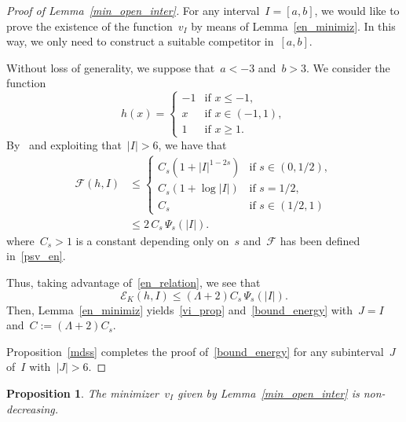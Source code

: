 \documentclass[10pt,a4paper]{amsart}
\newtheorem{prop}[theorem]{Proposition}
\numberwithin{equation}{section}
\newcommand{\Ec}{\mathcal{E}_K}
\begin{document}
\begin{proof}[Proof of Lemma~\ref{min_open_inter}]
For any interval~$I=[a,b]$, we would like to prove the existence of the function~$v_{I}$ by means of Lemma~\ref{en_minimiz}. In this way, we only need to construct a suitable competitor in~$[a,b]$.

Without loss of generality, we suppose that~$a<-3$ and~$b>3$. We consider the function
\begin{equation*}
h(x)= \begin{cases}
-1 &\mbox{if } x \leq -1,\\
x &\mbox{if } x \in (-1,1),\\
1 &\mbox{if } x\geq 1.
\end{cases}
\end{equation*}
By~\cite[Lemma~2]{PSV13} and exploiting that~$|I | >6$, we have that
\begin{equation*}
\begin{split}
\mathscr{F}(h, I) &\leq
\begin{cases}
C_s (1+ |I |^{1-2s}) &\mbox{if } s \in (0,1/2), \\
C_s (1 + \log |I | ) &\mbox{if } s = 1/2,\\
C_s &\mbox{if } s \in (1/2,1)
\end{cases}\\
&\leq 2\, C_s \,\Psi_s(|I |).
\end{split}
\end{equation*}
where~$C_s>1$ is a constant depending only on~$s$ and~$\mathscr{F}$ has been defined in~\eqref{psv_en}.

Thus, taking advantage of~\eqref{en_relation}, we see that
\begin{equation*}
\Ec(h, I) \leq \left( \Lambda +2 \right) C_s \,\Psi_s(|I |).
\end{equation*}
Then, Lemma~\ref{en_minimiz} yields~\eqref{vi_prop} and~\eqref{bound_energy} with~$J=I$
and~$C:=  \left( \Lambda +2 \right) C_s$.

Proposition~\ref{mdss} completes the proof of~\eqref{bound_energy} for any subinterval~$J$ of~$I$ with~$|J |>6$.
\end{proof}

\begin{prop}\label{eupro}
The minimizer~$v_I$ given by
Lemma~\ref{min_open_inter} is non-decreasing.
\end{prop}
\end{document}
